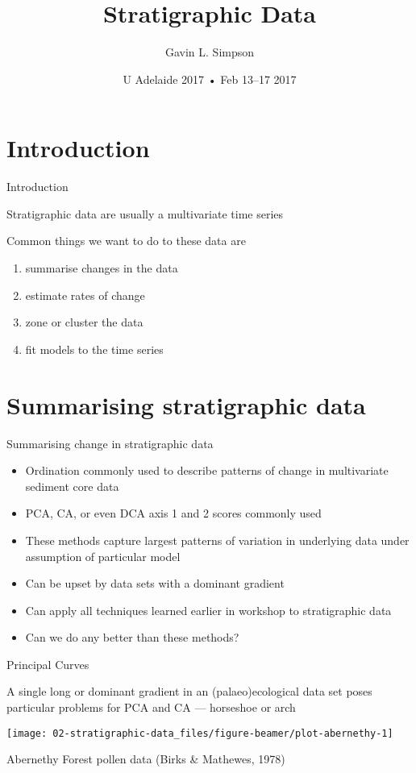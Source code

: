 \documentclass[10pt,ignorenonframetext,compress, aspectratio=169]{beamer}
\title{Stratigraphic Data}
\author{Gavin L. Simpson}
\date{U Adelaide 2017 • Feb 13--17 2017}
\providecommand{\tightlist}{%
  \setlength{\itemsep}{0pt}\setlength{\parskip}{0pt}}
\begin{document}
\frame{\titlepage}

\section{Introduction}\label{introduction}

\begin{frame}{Introduction}

Stratigraphic data are usually a multivariate time series

Common things we want to do to these data are

\begin{enumerate}
\def\labelenumi{\arabic{enumi}.}
\tightlist
\item
  summarise changes in the data
\item
  estimate rates of change
\item
  zone or cluster the data
\item
  fit models to the time series
\end{enumerate}

\end{frame}

\section{Summarising stratigraphic
data}\label{summarising-stratigraphic-data}

\begin{frame}{Summarising change in stratigraphic data}

\begin{itemize}
\tightlist
\item
  Ordination commonly used to describe patterns of change in
  multivariate sediment core data
\item
  PCA, CA, or even DCA axis 1 and 2 scores commonly used
\item
  These methods capture largest patterns of variation in underlying data
  under assumption of particular model
\item
  Can be upset by data sets with a dominant gradient
\item
  Can apply all techniques learned earlier in workshop to stratigraphic
  data
\item
  Can we do any better than these methods?
\end{itemize}

\end{frame}

\begin{frame}{Principal Curves}

A single long or dominant gradient in an (palaeo)ecological data set
poses particular problems for PCA and CA --- \alert{horseshoe} or
\alert{arch}

\begin{center}\texttt{[image: 02-stratigraphic-data\_files/figure-beamer/plot-abernethy-1]} \end{center}

Abernethy Forest pollen data (Birks \& Mathewes, 1978)

\end{frame}
\end{document}
